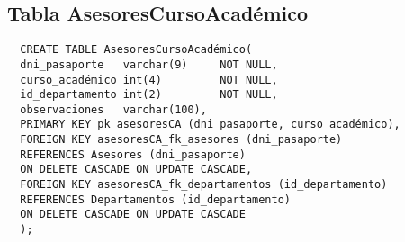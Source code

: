 \subsection{Tabla AsesoresCursoAcadémico}

\begin{verbatim}
  CREATE TABLE AsesoresCursoAcadémico(
  dni_pasaporte   varchar(9)     NOT NULL,
  curso_académico int(4)         NOT NULL,
  id_departamento int(2)         NOT NULL,
  observaciones   varchar(100),
  PRIMARY KEY pk_asesoresCA (dni_pasaporte, curso_académico),
  FOREIGN KEY asesoresCA_fk_asesores (dni_pasaporte)
  REFERENCES Asesores (dni_pasaporte)
  ON DELETE CASCADE ON UPDATE CASCADE,
  FOREIGN KEY asesoresCA_fk_departamentos (id_departamento)
  REFERENCES Departamentos (id_departamento)
  ON DELETE CASCADE ON UPDATE CASCADE
  );
\end{verbatim}